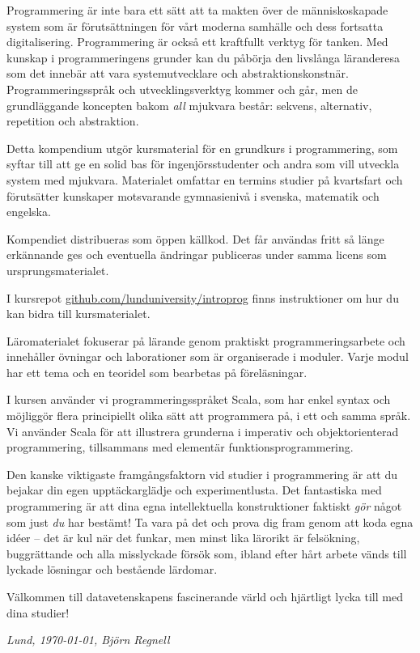 


Programmering är inte bara ett sätt att ta makten över de människoskapade system som är förutsättningen för vårt moderna samhälle och dess fortsatta digitalisering. Programmering är också ett kraftfullt verktyg för tanken. Med kunskap i programmeringens grunder kan du påbörja den livslånga läranderesa som det innebär att vara systemutvecklare och abstraktionskonstnär. Programmeringsspråk och utvecklingsverktyg kommer och går, men de grundläggande koncepten bakom \emph{all} mjukvara består: sekvens, alternativ, repetition och abstraktion. 

Detta kompendium utgör kursmaterial för en grundkurs i programmering, som syftar till att ge en solid bas för ingenjörsstudenter och andra som vill utveckla system med mjukvara. Materialet omfattar en termins studier på kvartsfart och förutsätter kunskaper motsvarande gymnasienivå i svenska, matematik och engelska. 

Kompendiet distribueras som öppen källkod. Det får användas fritt så länge erkännande ges och eventuella ändringar publiceras under samma licens som ursprungsmaterialet. 

I kursrepot \href{http://github.com/lunduniversity/introprog}{github.com/lunduniversity/introprog} finns instruktioner om hur du kan bidra till kursmaterialet.

Läromaterialet fokuserar på lärande genom praktiskt programmeringsarbete och innehåller övningar och laborationer som är organiserade i moduler. Varje modul har ett tema och en teoridel som bearbetas på föreläsningar. 

I kursen använder vi programmeringsspråket Scala, som har enkel syntax och möjliggör flera principiellt olika sätt att programmera på, i ett och samma språk. Vi använder Scala för att illustrera grunderna i imperativ och objektorienterad programmering, tillsammans med elementär funktionsprogrammering. 

Den kanske viktigaste framgångsfaktorn vid studier i programmering är att du bejakar din egen upptäckarglädje och experimentlusta. Det fantastiska med programmering är att dina egna intellektuella konstruktioner faktiskt \emph{gör} något som just \emph{du} har bestämt! Ta vara på det och prova dig fram genom att koda egna idéer -- det är kul när det funkar, men minst lika lärorikt är felsökning, buggrättande och alla misslyckade försök som, ibland efter hårt arbete vänds till lyckade lösningar och bestående lärdomar. 

Välkommen till datavetenskapens fascinerande värld och hjärtligt lycka till med dina studier!

\vspace{1em}\noindent \textit{\hfill Lund, \today, Björn Regnell}



